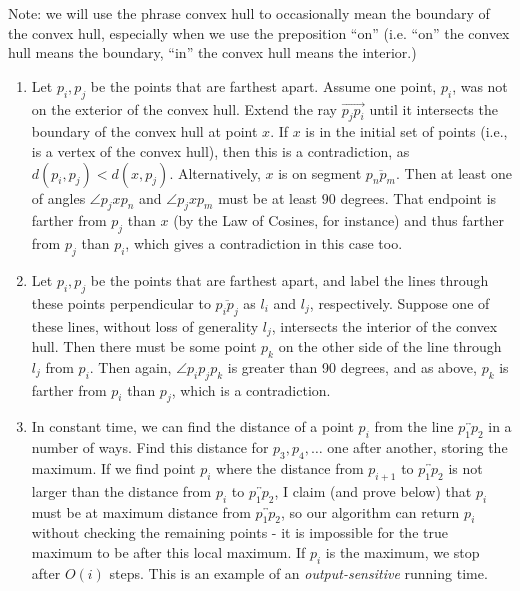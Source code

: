\documentclass{article}
\newcommand{\oline}[1]{\overleftrightarrow{#1}}
\begin{document}
{Note: we will use the phrase convex hull to occasionally mean the boundary
  of the convex hull, especially when we use the preposition ``on'' (i.e.
  ``on'' the convex hull means the boundary, ``in'' the convex hull means the
  interior.)
  \begin{enumerate}[label=(\alph*)]
    \item Let $p_i,p_j$ be the points that are farthest apart. Assume one point, $p_i$, was not on the exterior of the convex hull. Extend the ray $\overrightarrow{p_jp_i}$ until it intersects the boundary of the convex hull at point $x$. If $x$ is in the initial set of points (i.e., is a vertex of the convex hull), then this is a contradiction, as $d(p_i,p_j) < d(x,p_j)$. Alternatively, $x$ is on segment $\overline{p_np_m}$. Then at least one of angles $\angle p_jxp_n$ and $\angle p_jxp_m$ must be at least $90$ degrees. That endpoint is farther from $p_j$ than $x$ (by the Law of Cosines, for instance) and thus farther from $p_j$ than $p_i$, which gives a contradiction in this case too.
    \item Let $p_i,p_j$ be the points that are farthest apart, and label the lines through these points perpendicular to $\overline{p_ip_j}$ as $l_i$ and $l_j$, respectively. Suppose one of these lines, without loss of generality $l_j$, intersects the interior of the convex hull. Then there must be some point $p_k$ on the other side of the line through $l_j$ from $p_i$. Then again, $\angle p_ip_jp_k$ is greater than 90 degrees, and as above, $p_k$ is farther from $p_i$ than $p_j$, which is a contradiction.
            
    \item In constant time, we can find the distance of a point $p_i$ from the line $\oline{p_1p_2}$ in a number of ways. Find this distance for $p_3,p_4,\ldots$ one after another, storing the maximum. If we find point $p_i$ where the distance from $p_{i+1}$ to $\oline{p_1p_2}$ is not larger than the distance from $p_i$ to $\oline{p_1p_2}$, I claim (and prove below) that $p_i$ must be at maximum distance from $\oline{p_1p_2}$, so our algorithm can return $p_i$ without checking the remaining points - it is impossible for the true maximum to be after this local maximum. If $p_i$ is the maximum, we stop after $O(i)$ steps. This is an example of an {\it output-sensitive} running time.



\end{enumerate}}
\end{document}
